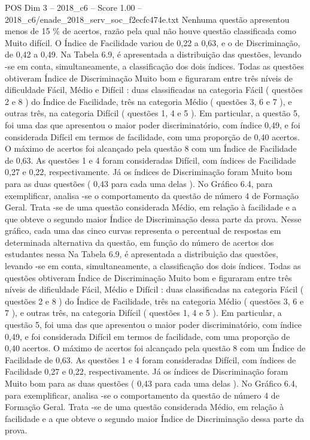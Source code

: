 \begin{textsample}{POS Dim 3 – 2018\_c6 – Score 1.00 – 2018\_c6/enade\_2018\_serv\_soc\_f2ecfc474e.txt}
Nenhuma questão apresentou menos de 15 \% de acertos, razão pela qual não houve questão classificada como Muito difícil.
O Índice de Facilidade variou de 0,22 a 0,63, e o de Discriminação, de 0,42 a 0,49.
Na Tabela 6.9, é apresentada a distribuição das questões, levando -se em conta, simultaneamente, a classificação dos dois índices.
Todas as questões obtiveram Índice de Discriminação Muito bom e figuraram entre três níveis de dificuldade Fácil, Médio e Difícil : duas classificadas na categoria Fácil ( questões 2 e 8 ) do Índice de Facilidade, três na categoria Médio ( questões 3, 6 e 7 ), e outras três, na categoria Difícil ( questões 1, 4 e 5 ).
Em particular, a questão 5, foi uma das que apresentou o maior poder discriminatório, com índice 0,49, e foi considerada Difícil em termos de facilidade, com uma proporção de 0,40 acertos.
O máximo de acertos foi alcançado pela questão 8 com um Índice de Facilidade de 0,63.
As questões 1 e 4 foram consideradas Difícil, com índices de Facilidade 0,27 e 0,22, respectivamente.
Já os índices de Discriminação foram Muito bom para as duas questões ( 0,43 para cada uma delas ).
No Gráfico 6.4, para exemplificar, analisa -se o comportamento da questão de número 4 de Formação Geral.
Trata -se de uma questão considerada Médio, em relação à facilidade e a que obteve o segundo maior Índice de Discriminação dessa parte da prova.
Nesse gráfico, cada uma das cinco curvas representa o percentual de respostas em determinada alternativa da questão, em função do número de acertos dos estudantes nessa Na Tabela 6.9, é apresentada a distribuição das questões, levando -se em conta, simultaneamente, a classificação dos dois índices.
Todas as questões obtiveram Índice de Discriminação Muito bom e figuraram entre três níveis de dificuldade Fácil, Médio e Difícil : duas classificadas na categoria Fácil ( questões 2 e 8 ) do Índice de Facilidade, três na categoria Médio ( questões 3, 6 e 7 ), e outras três, na categoria Difícil ( questões 1, 4 e 5 ).
Em particular, a questão 5, foi uma das que apresentou o maior poder discriminatório, com índice 0,49, e foi considerada Difícil em termos de facilidade, com uma proporção de 0,40 acertos.
O máximo de acertos foi alcançado pela questão 8 com um Índice de Facilidade de 0,63.
As questões 1 e 4 foram consideradas Difícil, com índices de Facilidade 0,27 e 0,22, respectivamente.
Já os índices de Discriminação foram Muito bom para as duas questões ( 0,43 para cada uma delas ).
No Gráfico 6.4, para exemplificar, analisa -se o comportamento da questão de número 4 de Formação Geral.
Trata -se de uma questão considerada Médio, em relação à facilidade e a que obteve o segundo maior Índice de Discriminação dessa parte da prova.

\end{textsample}
